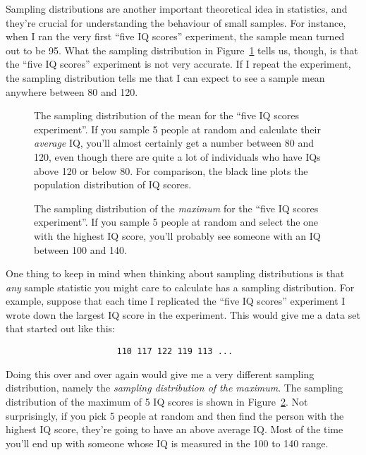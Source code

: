 Sampling distributions are another important theoretical idea in statistics, and they're crucial for understanding the behaviour of small samples. For instance, when I ran the very first ``five IQ scores'' experiment, the sample mean turned out to be 95. What the sampling distribution in Figure~\ref{fig:sampdistmean} tells us, though, is that the ``five IQ scores'' experiment is not very accurate. If I repeat the experiment, the sampling distribution tells me that I can expect to see a sample mean anywhere between 80 and 120. 


\begin{figure}[p]
\begin{center}
\caption{The sampling distribution of the mean for the ``five IQ scores experiment''. If you sample 5 people at random and calculate their {\it average} IQ, you'll almost certainly get a number between 80 and 120, even though there are quite a lot of individuals who have IQs above 120 or below 80. For comparison, the black line plots the population distribution of IQ scores.}
\label{fig:sampdistmean}
\HR
\end{center}
\end{figure}

\begin{figure}[p]
\begin{center}
\caption{The sampling distribution of the {\it maximum} for the ``five IQ scores experiment''. If you sample 5 people at random and select the one with the highest IQ score, you'll probably see someone with an IQ between 100 and 140.}
\label{fig:sampdistmax}
\HR
\end{center}
\end{figure}



One thing to keep in mind when thinking about sampling distributions is that {\it any} sample statistic you might care to calculate has a sampling distribution. For example, suppose that each time I replicated the ``five IQ scores'' experiment I wrote down the largest IQ score in the experiment. This would give me a data set that started out like this:
\begin{verbatim}
                      110 117 122 119 113 ... 
\end{verbatim}
Doing this over and over again would give me a very different sampling distribution, namely the {\it sampling distribution of the maximum}. The sampling distribution of the maximum of 5 IQ scores is shown in Figure~\ref{fig:sampdistmax}. Not surprisingly, if you pick 5 people at random and then find the person with the highest IQ score, they're going to have an above average IQ. Most of the time you'll end up with someone whose IQ is measured in the 100 to 140 range. 



